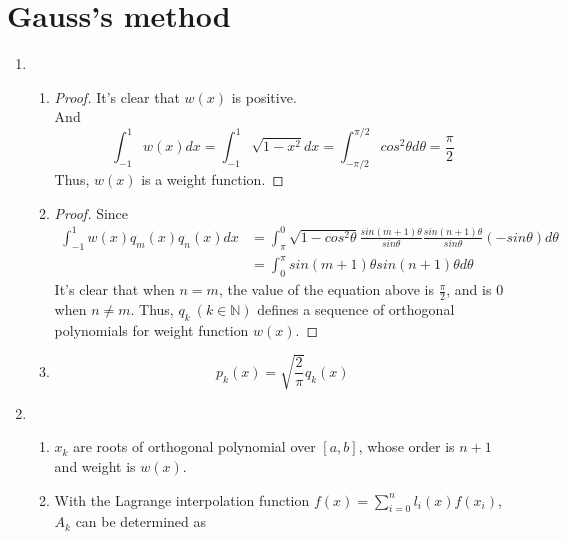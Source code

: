 \documentclass[paper=a4, fontsize=11pt]{scrartcl} %
\numberwithin{equation}{section} %
\numberwithin{figure}{section} %
\numberwithin{table}{section} %
\begin{document}
	
\section{Gauss's method}
\begin{enumerate}
	\item 
		\begin{enumerate}
			\item 
				\begin{proof}
					It's clear that $w(x)$ is positive.\\
					And
					\begin{equation}
						\int_{-1}^{1} w(x) dx = \int_{-1}^{1} \sqrt{1-x^2}dx = \int_{-\pi/2}^{\pi/2} cos^2\theta d\theta = \frac{\pi}{2}
					\end{equation}
					Thus, $w(x)$ is a weight function.
				\end{proof}
			\item 
				\begin{proof}
					Since
					\begin{equation}
						\begin{aligned}
							\int_{-1}^{1}w(x)q_m(x)q_n(x)dx 
							& = \int_{\pi}^{0} \sqrt{1-cos^2\theta} \frac{sin(m+1)\theta}{sin\theta} \frac{sin(n+1)\theta}{sin\theta}(-sin\theta)d\theta\\
							& = \int_{0}^{\pi} sin(m+1)\theta sin(n+1)\theta d\theta
						\end{aligned}
					\end{equation}
					It's clear that when $n=m$, the value of the equation above is $\frac{\pi}{2}$, and is $0$ when $n \neq m$.
					Thus, $q_k\  (k\in \mathbb{N})$ defines a sequence of orthogonal polynomials for weight function $w(x)$.
				\end{proof}
			\item
				\begin{equation}
					p_k(x) = \sqrt{\frac{2}{\pi}} q_k(x)
				\end{equation} 
		\end{enumerate}
	\item 
		\begin{enumerate}
			\item 
				$x_k$ are roots of orthogonal polynomial over $[a, b]$, whose order is $n+1$ and weight is $w(x)$.
			\item 
				With the Lagrange interpolation function $f(x) = \sum_{i=0}^{n} l_i(x)f(x_i)$, $A_k$ can be determined as

\end{enumerate}
\end{enumerate}
\end{document}
